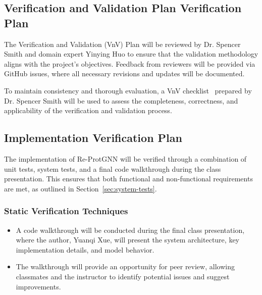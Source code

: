 \documentclass[12pt, titlepage]{article}
\begin{document}
\subsection{Verification and Validation Plan Verification Plan}
\label{sec:vvp}
The Verification and Validation (VnV) Plan will be reviewed by Dr. Spencer Smith and domain expert Yinying Huo to ensure that the validation methodology aligns with the project’s objectives. Feedback from reviewers will be provided via GitHub issues, where all necessary revisions and updates will be documented.

To maintain consistency and thorough evaluation, a VnV checklist~\citep{Yuanqi_ReProtGNN_VnVChecklist} prepared by Dr. Spencer Smith will be used to assess the completeness, correctness, and applicability of the verification and validation process. 


\subsection{Implementation Verification Plan}
\label{sec:ivp}

The implementation of Re-ProtGNN will be verified through a combination of unit tests, system tests, and a final code walkthrough during the class presentation. This ensures that both functional and non-functional requirements are met, as outlined in Section~\ref{sec:system-tests}.

\subsubsection{Static Verification Techniques} 
    \begin{itemize} 
    \item A code walkthrough will be conducted during the final class presentation, where the author, Yuanqi Xue, will present the system architecture, key implementation details, and model behavior.
    
    \item The walkthrough will provide an opportunity for peer review, allowing classmates and the instructor to identify potential issues and suggest improvements. 

\end{itemize}
\end{document}
